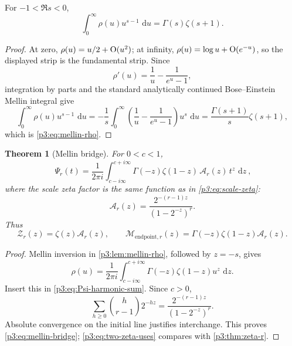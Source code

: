 \documentclass[11pt,oneside]{article}
\newtheorem{theorem}{Theorem}[section]
\theoremstyle{definition}
\theoremstyle{remark}
\newcommand{\dd}{\,\mathrm d}
\begin{document}
\begin{lemma}\label{p3:lem:mellin-rho}
For $-1<\Re s<0$,
\begin{equation}\label{p3:eq:mellin-rho}
 \int_0^{\infty}\rho(u)u^{s-1}\,\dd u
 =\Gamma(s)\zeta(s+1).
\end{equation}
\end{lemma}

\begin{proof}
At zero, $\rho(u)=u/2+\mathrm O(u^2)$; at infinity, $\rho(u)=\log u+\mathrm O(e^{-u})$, so the displayed strip is the fundamental strip.  Since
\[
 \rho'(u)=\frac1u-\frac1{e^u-1},
\]
integration by parts and the standard analytically continued Bose--Einstein Mellin integral give
\[
 \int_0^\infty\rho(u)u^{s-1}\,\dd u
 =-\frac1s\int_0^\infty
 \left(\frac1u-\frac1{e^u-1}\right)u^s\,\dd u
 =\frac{\Gamma(s+1)}s\zeta(s+1),
\]
which is \eqref{p3:eq:mellin-rho}.
\end{proof}

\begin{theorem}[Mellin bridge]\label{p3:thm:mellin-bridge}
For $0<c<1$,
\begin{equation}\label{p3:eq:mellin-bridge}
 \boxed{\ 
 \Psi_r(t)=\frac1{2\pi i}
 \int_{c-i\infty}^{c+i\infty}
 \Gamma(-z)\zeta(1-z)\,
 \mathcal A_r(z)\,t^z\,\dd z
 \ },
\end{equation}
where the scale zeta factor is the same function as in \eqref{p3:eq:scale-zeta}:
\begin{equation}\label{p3:eq:scale-zeta-repeat}
  \mathcal A_r(z)=\frac{2^{-(r-1)z}}{(1-2^{-z})^r}.
\end{equation}
Thus
\begin{equation}\label{p3:eq:two-zeta-uses}
 \mathcal Z_r(z)=\zeta(z)\mathcal A_r(z),
 \qquad
 \mathcal M_{\mathrm{endpoint},r}(z)
 =\Gamma(-z)\zeta(1-z)\mathcal A_r(z).
\end{equation}
\end{theorem}

\begin{proof}
Mellin inversion in \cref{p3:lem:mellin-rho}, followed by $z=-s$, gives
\[
 \rho(u)=\frac1{2\pi i}\int_{c-i\infty}^{c+i\infty}
 \Gamma(-z)\zeta(1-z)u^z\,\dd z.
\]
Insert this in \eqref{p3:eq:Psi-harmonic-sum}.  Since $c>0$,
\[
 \sum_{h\ge0}\binom h{r-1}2^{-hz}
 =\frac{2^{-(r-1)z}}{(1-2^{-z})^r}.
\]
Absolute convergence on the initial line justifies interchange.  This proves \eqref{p3:eq:mellin-bridge}; \eqref{p3:eq:two-zeta-uses} compares with \cref{p3:thm:zeta-r}.
\end{proof}
\end{document}
